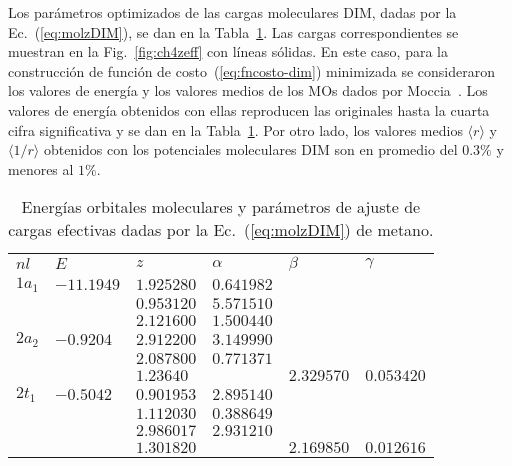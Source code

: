 Los parámetros optimizados de las cargas moleculares DIM, dadas por la 
Ec.~(\ref{eq:molzDIM}), se dan en la Tabla~\ref{tab:ch4parameters}. Las 
cargas correspondientes se muestran en la Fig.~\ref{fig:ch4zeff} con 
líneas sólidas.  En este caso, para la construcción de función de 
costo~(\ref{eq:fncosto-dim}) minimizada se consideraron los valores de 
energía y los valores medios de los MOs dados por 
Moccia~\cite{Moccia:69}. Los valores de energía obtenidos con ellas 
reproducen las originales hasta la cuarta cifra significativa y se dan 
en la Tabla~\ref{tab:ch4parameters}. Por otro lado, los valores medios 
$\langle r\rangle$ y $\langle 1/r\rangle$ obtenidos con los potenciales 
moleculares DIM son en promedio del $0.3\%$ y menores al $1\%$.

\begin{table}[t]
\centering
\begin{tabular}{
>{\centering\arraybackslash}p{}
>{\centering\arraybackslash}p{}
>{\centering\arraybackslash}p{}
>{\centering\arraybackslash}p{}
>{\centering\arraybackslash}p{}
>{\centering\arraybackslash}p{}}
\rowcolor{mydarkgray} 
   $nl$ & $E$        & $z$        & $\alpha$   & $\beta$ & $\gamma$ \\
$1a_1$  & $-11.1949$ & $1.925280$ & $0.641982$ & & \\
\rowcolor{mygray} 
        &            & $0.953120$ & $5.571510$ & & \\
        &            & $2.121600$ & $1.500440$ & & \\
\rowcolor{mygray} 
$2a_2$  & $-0.9204$  & $2.912200$ & $3.149990$ & & \\
        &            & $2.087800$ & $0.771371$ & & \\
\rowcolor{mygray} 
        &            & $1.23640$  &            & $2.329570$ & $0.053420$ \\
$2t_1$  & $-0.5042$  & $0.901953$ & $2.895140$ & & \\
\rowcolor{mygray} 
        &            & $1.112030$ & $0.388649$ & & \\
        &            & $2.986017$ & $2.931210$ & & \\
\rowcolor{mygray} 
        &            & $1.301820$ &            & $2.169850$ & $0.012616$ \\ 
\end{tabular}
\caption[Energías y parámetros de ajuste de cargas efectivas de metano.]
{Energías orbitales moleculares y parámetros de ajuste de cargas efectivas dadas por la Ec.~(\ref{eq:molzDIM}) de metano.}
\label{tab:ch4parameters}
\end{table}

